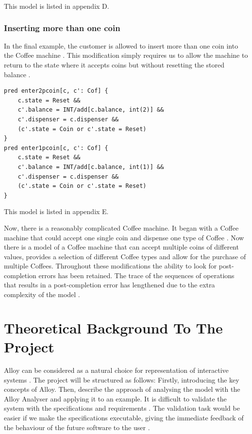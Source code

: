 \documentclass[a4paper,10pt]{report}
\begin{document}
This model is listed in appendix D.

\subsection{Inserting more than one coin}
\label{Inserting more than one coin}

In the final example, the customer is allowed to insert more than one coin into the Coffee machine \cite{Boyatt}. This modification simply requires us to allow the machine to return to the state where it accepts coins but without resetting the stored balance \cite{Boyatt}.

\begin{verbatim}
pred enter2pcoin[c, c': Cof] {
	c.state = Reset &&
	c'.balance = INT/add[c.balance, int(2)] &&
	c'.dispenser = c.dispenser &&
	(c'.state = Coin or c'.state = Reset)
}
pred enter1pcoin[c, c': Cof] {
	c.state = Reset &&
	c'.balance = INT/add[c.balance, int(1)] &&
	c'.dispenser = c.dispenser &&
	(c'.state = Coin or c'.state = Reset)
}
\end{verbatim}

This model is listed in appendix E.

Now, there is a reasonably complicated Coffee machine. It began with a Coffee machine that could accept one single coin and dispense one type of Coffee \cite{Boyatt}. Now there is a model of a Coffee machine that can accept multiple coins of different values, provides a selection of different Coffee types and allow for the purchase of multiple Coffees. Throughout these modifications the ability to look for post-completion errors has been retained. The trace of the sequences of operations that results in a post-completion error has lengthened due to the extra complexity of the model \cite{Boyatt}.
 
\chapter{Theoretical Background To The Project}
Alloy can be considered as a natural choice for representation of interactive systems \cite{P.Curson}.  The project will be structured as follows:
 Firstly, introducing the key concepts of Alloy. Then, describe the approach of analysing the model with the Alloy Analyser and applying it to an example.
It is difficult to validate the system with the specifications and requirements \cite{Boyatt}. The     validation task would be easier if we make the specifications executable, giving the immediate feedback of the behaviour of the future software to the user \cite{Boyatt}.
\end{document}
